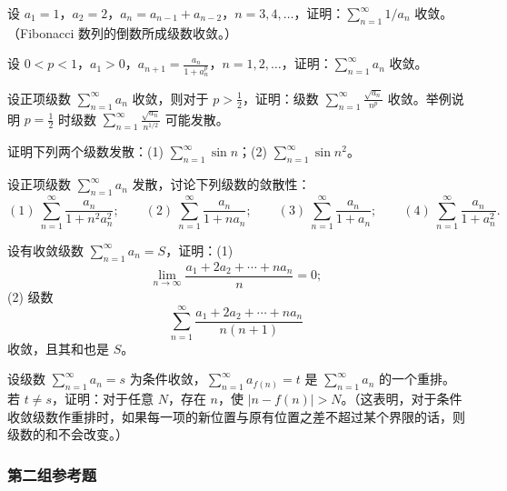 \begin{xreferenceproblem}[14]
设 $a_1=1$，$a_2=2$，$a_n=a_{n-1}+a_{n-2}$，$n=3,4,\ldots$，证明：$\sum_{n=1}^{\infty}1/a_n$ 收敛。（Fibonacci 数列的倒数所成级数收敛。）
\end{xreferenceproblem}

\begin{xreferenceproblem}[15]
设 $0<p<1$，$a_1>0$，$a_{n+1}=\frac{a_n}{1+a_n^p}$，$n=1,2,\ldots$，证明：$\sum_{n=1}^{\infty}a_n$ 收敛。
\end{xreferenceproblem}

\begin{xreferenceproblem}[16]
设正项级数 $\sum_{n=1}^{\infty}a_n$ 收敛，则对于 $p>\frac12$，证明：级数 $\sum_{n=1}^{\infty}\frac{\sqrt{a_n}}{n^p}$ 收敛。举例说明 $p=\frac12$ 时级数 $\sum_{n=1}^{\infty}\frac{\sqrt{a_n}}{n^{1/2}}$ 可能发散。
\end{xreferenceproblem}

\begin{xreferenceproblem}[17]
证明下列两个级数发散：(1) $\sum_{n=1}^{\infty}\sin n$；(2) $\sum_{n=1}^{\infty}\sin n^2$。
\end{xreferenceproblem}

\begin{xreferenceproblem}[18]
设正项级数 $\sum_{n=1}^{\infty}a_n$ 发散，讨论下列级数的敛散性：
\[
(1)\ \sum_{n=1}^{\infty}\frac{a_n}{1+n^2a_n^2};\qquad
(2)\ \sum_{n=1}^{\infty}\frac{a_n}{1+na_n};\qquad
(3)\ \sum_{n=1}^{\infty}\frac{a_n}{1+a_n};\qquad
(4)\ \sum_{n=1}^{\infty}\frac{a_n}{1+a_n^2}.
\]
\end{xreferenceproblem}

\begin{xreferenceproblem}[19]
设有收敛级数 $\sum_{n=1}^{\infty}a_n=S$，证明：(1)
\[
\lim_{n\to\infty}\frac{a_1+2a_2+\cdots+na_n}{n}=0;
\]
(2) 级数
\[
\sum_{n=1}^{\infty}\frac{a_1+2a_2+\cdots+na_n}{n(n+1)}
\]
收敛，且其和也是 $S$。
\end{xreferenceproblem}

\begin{xreferenceproblem}[20]
设级数 $\sum_{n=1}^{\infty}a_n=s$ 为条件收敛，$\sum_{n=1}^{\infty}a_{f(n)}=t$ 是 $\sum_{n=1}^{\infty}a_n$ 的一个重排。若 $t\neq s$，证明：对于任意 $N$，存在 $n$，使 $|n-f(n)|>N$。（这表明，对于条件收敛级数作重排时，如果每一项的新位置与原有位置之差不超过某个界限的话，则级数的和不会改变。）
\end{xreferenceproblem}

\subsubsection*{第二组参考题}

